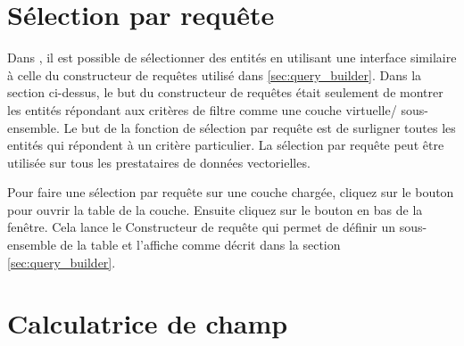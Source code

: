 \section{Sélection par requête}\label{sec:select_by_query}

Dans \qg, il est possible de sélectionner des entités en utilisant une interface 
similaire à celle du constructeur de requêtes utilisé dans \ref{sec:query_builder}. 
Dans la section ci-dessus, le but du constructeur de requêtes était seulement de 
montrer les entités répondant aux critères de filtre comme une couche virtuelle/ 
sous-ensemble. Le but de la fonction de sélection par requête est de surligner 
toutes les entités qui répondent à un critère particulier. La sélection par 
requête peut être utilisée sur tous les prestataires de données vectorielles.

Pour faire une sélection par requête sur une couche chargée, cliquez sur le 
bouton\\  pour ouvrir 
la table de la couche. Ensuite cliquez sur le bouton  en bas 
de la fenêtre. Cela lance le Constructeur de requête qui permet de définir un 
sous-ensemble de la table et l'affiche comme décrit dans la section~
\ref{sec:query_builder}.

\section{Calculatrice de champ}\label{sec:field_calculator}

